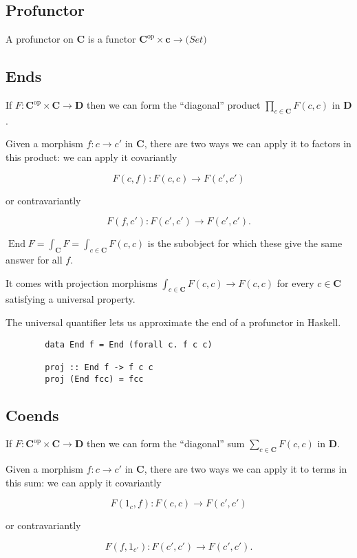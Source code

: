 \documentclass[11pt]{amsart}
\DeclareMathOperator{\End}{End}
\newcommand{\cat}[1]{\mathbf{#1}}
\newcommand{\op}[1]{#1^{\text{op}}}
\begin{document}
    \subsection*{Profunctor}
    A profunctor on $\cat C$ is a functor $\op{\cat C} \times {\cat c} \to \cat(Set)$

    \subsection*{Ends}
    If $F:\op{\cat C} \times \cat C \to \cat D$
    then we can form the ``diagonal'' product $\prod_{c\in\cat C} F(c,c)$ in $\cat D$.

    Given a morphism $f: c \to c'$ in $\cat C$, there are two ways we can apply it to factors in this product:
    we can apply it covariantly

    \[
        F(c, f): F(c,c) \to F(c', c')
    \]

    or contravariantly

    \[
        F(f, c'): F(c',c') \to F(c', c').
    \]

    $\End F = \int_{\cat C} F = \int_{c\in\cat C} F(c,c)$
    is the subobject for which these give the same answer for all $f$.

    It comes with projection morphisms
    $\int_{c\in\cat C} F(c,c) \to F(c, c)$ for every $c\in \cat{C}$
    satisfying a universal property.

    The universal quantifier lets us approximate the end of a profunctor in Haskell.

    \begin{verbatim}
        data End f = End (forall c. f c c)

        proj :: End f -> f c c
        proj (End fcc) = fcc
    \end{verbatim}

    \subsection*{Coends}
    If $F:\cat C^{\text{op}} \times \cat C \to \cat D$
    then we can form the ``diagonal'' sum $\sum_{c\in\cat C} F(c,c)$ in $\cat D$.

    Given a morphism $f: c \to c'$ in $\cat C$, there are two ways we can apply it to terms in this sum:
    we can apply it covariantly

    \[
        F(1_c, f): F(c,c) \to F(c', c')
    \]

    or contravariantly

    \[
        F(f, 1_{c'}): F(c',c') \to F(c', c').
    \]
\end{document}

